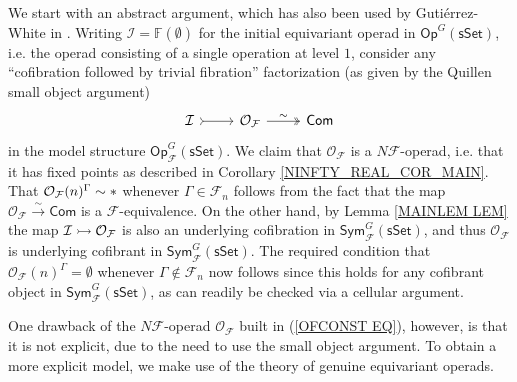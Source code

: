 \documentclass[a4paper,10pt]{article}%
\begin{document}
We start with an abstract argument, which has also been used by Guti\'{e}rrez-White in \cite{GW17}. 
Writing 
$\mathcal{I} = \mathbb{F} (\emptyset)$
for the initial equivariant operad in 
$\mathsf{Op}^G(\mathsf{sSet})$,
i.e. the operad consisting of a single operation at level $1$,
consider any 
``cofibration followed by trivial fibration'' factorization
(as given by the
Quillen small object argument)
\begin{equation}\label{OFCONST EQ}
\begin{tikzcd}
	\mathcal{I} \arrow[r, rightarrowtail] &
	\O_{\mathcal{F}}
	\arrow[r,twoheadrightarrow, "\sim"] &
	\mathsf{Com}
\end{tikzcd}
\end{equation}
in the model structure 
$\mathsf{Op}^G_{\mathcal{F}}(\mathsf{sSet})$.
We claim that $\mathcal{O}_{\mathcal{F}}$
is a $N \mathcal{F}$-operad, i.e.
that it has fixed points as described in 
Corollary \ref{NINFTY_REAL_COR_MAIN}.
That $\mathcal{O}_{\mathcal{F}}(n)^{\Gamma} \sim \**$
whenever $\Gamma \in \mathcal{F}_n$
follows from the fact that the map
$\mathcal{O}_{\mathcal{F}} \xrightarrow{\sim} \mathsf{Com}$
is a $\mathcal{F}$-equivalence.
On the other hand, by Lemma \ref{MAINLEM LEM}
the map 
$\mathcal{I} \rightarrowtail \mathcal{O}_{\mathcal{F}}$
is also an underlying cofibration in 
$\mathsf{Sym}^G_{\mathcal{F}}(\mathsf{sSet})$, and thus
$\mathcal{O}_{\mathcal{F}}$ is underlying cofibrant in 
$\mathsf{Sym}^G_{\mathcal{F}}(\mathsf{sSet})$.
The required condition that
$\mathcal{O}_{\mathcal{F}} (n)^{\Gamma}
= \emptyset $
whenever $\Gamma \nin \mathcal{F}_n$
now follows since this holds for any cofibrant object in $\mathsf{Sym}^G_{\mathcal{F}}(\mathsf{sSet})$,
as can readily be checked via a cellular argument.

One drawback of the 
$N \mathcal{F}$-operad $\mathcal{O}_{\mathcal{F}}$
built in (\ref{OFCONST EQ}),
however, is that it is not explicit,
due to the need to use the small object argument.
To obtain a more explicit model, we make use of the theory of genuine equivariant operads.
\end{document}
